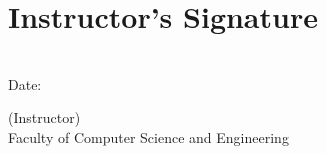 \chapter*{Instructor's Signature}

\vspace{1cm}

\makebox[0.7\linewidth][l]{\hrulefill} \\
 Date:\makebox[0.2\linewidth][l]{\hrulefill}

    \begin{flushleft}
     (Instructor)\\
    \vspace{4cm}
    Faculty of Computer Science and Engineering
    \end{flushleft}
